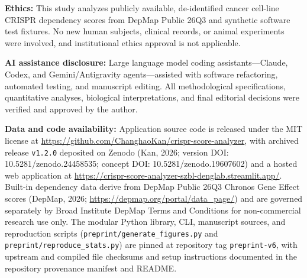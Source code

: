 \documentclass[11pt,a4paper]{article}
\begin{document}
\textbf{Ethics:} This study analyzes publicly available, de-identified cancer cell-line CRISPR dependency scores from DepMap Public 26Q3 and synthetic software test fixtures. No new human subjects, clinical records, or animal experiments were involved, and institutional ethics approval is not applicable.

\textbf{AI assistance disclosure:} Large language model coding assistants---Claude, Codex, and Gemini/Antigravity agents---assisted with software refactoring, automated testing, and manuscript editing. All methodological specifications, quantitative analyses, biological interpretations, and final editorial decisions were verified and approved by the author.

\textbf{Data and code availability:} Application source code is released under the MIT license at \url{https://github.com/ChanghaoKan/crispr-score-analyzer}, with archived release \texttt{v1.2.0} deposited on Zenodo (Kan, 2026; version DOI: 10.5281/zenodo.24458535; concept DOI: 10.5281/zenodo.19607602) and a hosted web application at \url{https://crispr-score-analyzer-szbl-denglab.streamlit.app/}. Built-in dependency data derive from DepMap Public 26Q3 Chronos Gene Effect scores (DepMap, 2026; \url{https://depmap.org/portal/data\_page/}) and are governed separately by Broad Institute DepMap Terms and Conditions for non-commercial research use only. The modular Python library, CLI, manuscript sources, and reproduction scripts (\texttt{preprint/generate\_figures.py} and \texttt{preprint/reproduce\_stats.py}) are pinned at repository tag \texttt{preprint-v6}, with upstream and compiled file checksums and setup instructions documented in the repository provenance manifest and README.
\end{document}
